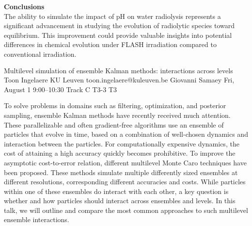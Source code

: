 \begin{talk}
\textbf{Conclusions}\\
The ability to simulate the impact of pH on water radiolysis represents a significant advancement in studying the evolution of radiolytic species toward equilibrium. This improvement could provide valuable insights into potential differences in chemical evolution under FLASH irradiation compared to conventional irradiation.


\medskip



\end{talk}
\begin{talk}
  {Multilevel simulation of ensemble Kalman methods: interactions across levels}%
  {Toon Ingelaere}%
  {KU Leuven}%
  {toon.ingelaere@kuleuven.be}%
  {Giovanni Samaey}%
  {}%
  {Fri, August 1 9:00–10:30 Track C}%
  {T3-3}%
  {T3}%

        To solve problems in domains such as filtering, optimization, and posterior sampling,
        ensemble Kalman methods have recently received much attention. These parallelizable and often gradient-free algorithms use an ensemble of particles that evolve in time, based on a combination of well-chosen dynamics and interaction between the particles. For computationally expensive dynamics, the cost of attaining a high accuracy quickly becomes prohibitive. To improve the asymptotic cost-to-error relation, different multilevel Monte Caro techniques have been proposed. These methods simulate multiple differently sized ensembles at different resolutions, corresponding different accuracies and costs. While particles within one of these ensembles do interact with each other, a key question is whether and how particles should interact across ensembles and levels.
        In this talk, we will outline and compare the most common approaches to such multilevel ensemble interactions.

\medskip

\end{talk}

